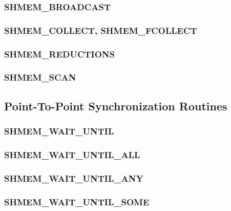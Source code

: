\documentclass[10pt,oneside]{book}
\begin{document}
\subsubsection{\textbf{SHMEM\_BROADCAST}}\label{subsec:shmem_broadcast}


\subsubsection{\textbf{SHMEM\_COLLECT, SHMEM\_FCOLLECT}}\label{subsec:shmem_collect}


\subsubsection{\textbf{SHMEM\_REDUCTIONS}}\label{subsec:shmem_reductions}


\subsubsection{\textbf{SHMEM\_SCAN}}\label{subsec:shmem_scan}





\subsection{Point-To-Point Synchronization Routines}\label{subsec:p2p_intro}


\subsubsection{\textbf{SHMEM\_WAIT\_UNTIL}}\label{subsec:shmem_wait_until}


\subsubsection{\textbf{SHMEM\_WAIT\_UNTIL\_ALL}}\label{subsec:shmem_wait_until_all}


\subsubsection{\textbf{SHMEM\_WAIT\_UNTIL\_ANY}}\label{subsec:shmem_wait_until_any}


\subsubsection{\textbf{SHMEM\_WAIT\_UNTIL\_SOME}}\label{subsec:shmem_wait_until_some}

\end{document}
